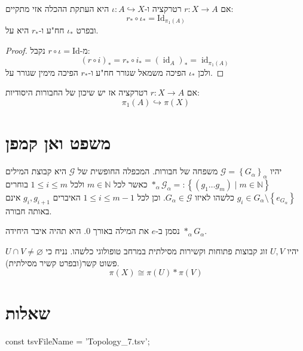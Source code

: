 \documentclass{tstextbook}
\begin{document}
\begin{lemma}
אם \(r:X\to A\) רטרקציה ו-\(\iota:A\hookrightarrow X\) היא העתקת ההכלה אזי מתקיים:
$$r_{*}\circ  \iota_{*}=\mathrm{Id}_{\pi_{1}(A)}$$
ובפרט \(\iota_{*}\) חח"ע ו-\(r_{*}\) היא על.

\end{lemma}
\begin{proof}
מ-\(r\circ\iota=\mathrm{Id}\) נקבל:
$$(r\circ i)_{*}=r_{*}\circ i_{*}=(\operatorname{id}_{A})_{*}=\operatorname{id}_{\pi_{1}(A)}$$
ולכן \(\iota_{*}\) הפיכה משמאל שגורר חח"ע ו-\(r_{*}\) הפיכה מימין שגורר על.

\end{proof}
\begin{corollary}
אם \(r:X\to A\) רטרקציה אז יש שיכון של החבורות היסודיות:
$$\pi_{1}(A)\hookrightarrow  \pi(X)$$

\end{corollary}
\section{משפט ואן קמפן}

\begin{definition}
יהיו \(\mathcal{G}=\left\{  G_{\alpha}  \right\}_{\alpha}\) משפחה של חבורות. המכפלה החופשית של \(\mathcal{G}\) היא קבוצת המילים \(*_{\alpha}\mathcal{G}_{\alpha}=: \left\{  \left( g_{1}\dots g_{m} \right)\mid m \in \mathbb{N}  \right\}\) כאשר לכל \(m \in \mathbb{N}\) ולכל \(1\leq i\leq m\) בוחרים \(g_{i}\in G_{\alpha}\setminus \left\{  e_{G_{\alpha}}  \right\}\) כלשהו לאיזו \(G_{\alpha}\in \mathcal{G}\). וכן לכל \(1\leq i \leq m-1\) האיברים \(g_{i},g_{i+1}\) אינם באותה חבורה.

\end{definition}
\begin{symbolize}
נסמן ב-\(e\) את המילה באורך 0. היא תהיה איבר היחידה \(*_{\alpha}G_{\alpha}\). 

\end{symbolize}
\begin{theorem}
יהיו \(U,V\) זוג קבוצות פתוחות וקשירות מסילתית במרחב טופולוגי כלשהו. נניח כי \(U\cap V\neq \varnothing\) פשוט קשר(ובפרט קשיר מסילתית).
$$\pi(X)\cong \pi(U)*\pi(V)$$

\end{theorem}
\section{שאלות}


    const tsvFileName = 'Topology_7.tsv';
\end{document}
